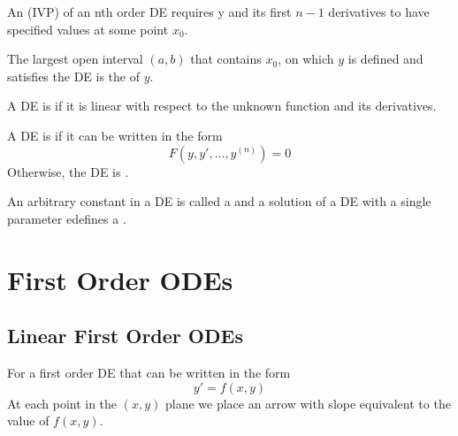 \documentclass[12pt, a4paper, oneside, openright, titlepage]{book}
\begin{document}


\begin{defn}[IVP]
        An  (IVP) of an nth order DE requires y and its first $n-1$ derivatives to have specified values at some point $x_0$.
\end{defn}





\begin{defn}[Validity]
        The largest open interval $(a,b)$ that contains $x_0$, on which $y$ is defined and satisfies the DE is the  of $y$.
\end{defn}





\begin{defn}[Linear]
        A DE is  if it is linear with respect to the unknown function and its derivatives.
\end{defn}




\begin{defn}[Homogeneous]
        A DE is  if it can be written in the form \begin{equation}
                F(y,y',...,y^{(n)}) = 0
        \end{equation}
        Otherwise, the DE is .
\end{defn}




\begin{defn}[Parameter]
        An arbitrary constant in a DE is called a  and a solution of a DE with a single parameter edefines a .
\end{defn}




\clearpage 


\chapter{First Order ODEs}



\section{Linear First Order ODEs}

\begin{defn}
        For a first order DE that can be written in the form \begin{equation}
                y' = f(x,y)
        \end{equation}
        At each point in the $(x,y)$ plane we place an arrow with slope equivalent to the value of $f(x,y)$.
\end{defn}
\end{document}
